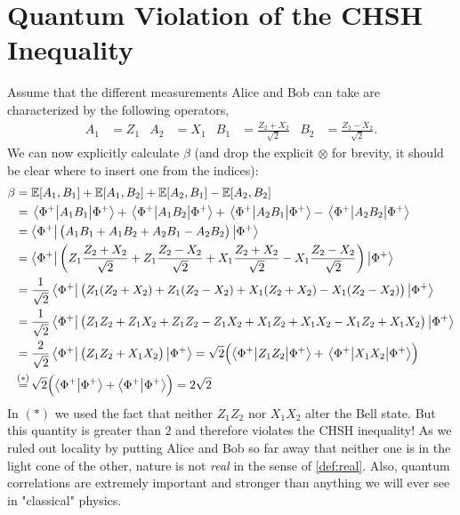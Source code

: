 	\section{Quantum Violation of the CHSH Inequality}
		Assume that the different measurements Alice and Bob can take are characterized by the following operators,
		\begin{align}
			A_1 & = Z_1                         &
			A_2 & = X_1                         &
			B_1 & = \frac{Z_2 + X_2}{\sqrt{2}}  &
			B_2 & = \frac{Z_2 - X_2}{\sqrt{2}}.
		\end{align}
		We can now explicitly calculate \(\beta\) (and drop the explicit \(\otimes\) for brevity, it should be clear where to insert one from the indices):
		\begin{align}
			\beta
			 & = \E[A_1, B_1] + \E[A_1, B_2] + \E[A_2, B_1] - \E[A_2, B_2]                                                                                                                   \\
			 & = \mel{\Phi^+}{A_1 B_1}{\Phi^+} + \mel{\Phi^+}{A_1 B_2}{\Phi^+} + \mel{\Phi^+}{A_2 B_1}{\Phi^+} - \mel{\Phi^+}{A_2 B_2}{\Phi^+}                                               \\
			 & = \bra{\Phi^+} \bigl( A_1 B_1 + A_1 B_2 + A_2 B_1 - A_2 B_2 \bigr) \ket{\Phi^+}                                                                                               \\
			 & = \bra{\Phi^+} \biggl( Z_1 \frac{Z_2 + X_2}{\sqrt{2}} + Z_1 \frac{Z_2 - X_2}{\sqrt{2}} + X_1 \frac{Z_2 + X_2}{\sqrt{2}} - X_1 \frac{Z_2 - X_2}{\sqrt{2}} \biggr) \ket{\Phi^+} \\
			 & = \frac{1}{\sqrt{2}} \bra{\Phi^+} \bigl( Z_1 (Z_2 + X_2) + Z_1 (Z_2 - X_2) + X_1 (Z_2 + X_2) - X_1 (Z_2 - X_2) \bigr) \ket{\Phi^+}                                            \\
			 & = \frac{1}{\sqrt{2}} \bra{\Phi^+} \bigl( Z_1 Z_2 + Z_1 X_2 + Z_1 Z_2 - Z_1 X_2 + X_1 Z_2 + X_1 X_2 - X_1 Z_2 + X_1 X_2 \bigr) \ket{\Phi^+}                                    \\
			 & = \frac{2}{\sqrt{2}} \bra{\Phi^+} \bigl( Z_1 Z_2 + X_1 X_2 \bigr) \ket{\Phi^+}
			= \sqrt{2} \Bigl(\! \mel{\Phi^+}{Z_1 Z_2}{\Phi^+} + \mel{\Phi^+}{X_1 X_2}{\Phi^+} \Bigr)                                                                                         \\
			 & \overset{\mathclap{(\ast)}}{=} \sqrt{2} \Bigl( \ip{\Phi^+}{\Phi^+} + \ip{\Phi^+}{\Phi^+} \Bigr)
			= 2 \sqrt{2}
		\end{align}
		In \((\ast)\) we used the fact that neither \(Z_1 Z_2\) nor \(X_1 X_2\) alter the Bell state. But this quantity is greater than \(2\) and therefore violates the CHSH inequality! As we ruled out locality by putting Alice and Bob so far away that neither one is in the light cone of the other, nature is not \emph{real} in the sense of \autoref{def:real}. Also, quantum correlations are extremely important and stronger than anything we will ever see in "classical" physics.

